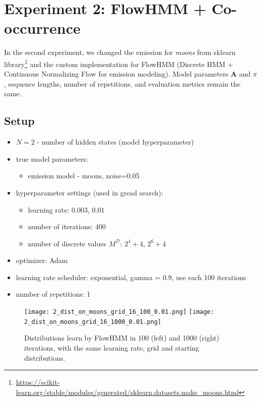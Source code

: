 \documentclass[shortabstract]{iithesis}
\begin{document}
\newpage
\section{Experiment 2: FlowHMM + Co-occurrence}

In the second experiment, we changed the emission for \textit{moons} from sklearn library\footnote{\url{https://scikit-learn.org/stable/modules/generated/sklearn.datasets.make_moons.html}} and the custom implementation for FlowHMM (Discrete HMM + Continuous Normalizing Flow for emission modeling). Model parameters $\textbf{A}$ and $\pi$, sequence lengths, number of repetitions, and evaluation metrics remain the same.

\subsection{Setup}

\begin{itemize}
    \item $N = 2$ - number of hidden states (model hyperparameter)
    \item true model parameters:
    \begin{itemize}
        \item emission model - moons, noise=0.05
    \end{itemize}
    \item hyperparameter settings (used in gread search):
    \begin{itemize}
        \item learning rate: $0.003$, $0.01$
        \item number of iterations: $400$
        \item number of discrete values $M^{\mathcal D}$: $2^4 + 4$, $2^6 + 4$
    \end{itemize}
    \item optimizer: Adam
    \item learning rate scheduler: exponential, gamma = 0.9, use each 100 iterations
    \item number of repetitions: 1
\end{itemize}

\begin{figure}[!ht]
    \centering
    \texttt{[image: 2\_dist\_on\_moons\_grid\_16\_100\_0.01.png]}
    \texttt{[image: 2\_dist\_on\_moons\_grid\_16\_1000\_0.01.png]}
    \caption{Distributions learn by FlowHMM in 100 (left) and 1000 (right) iterations, with the same learning rate, grid and starting distributions.}
    \label{fig:bad_res}
\end{figure}
\end{document}
